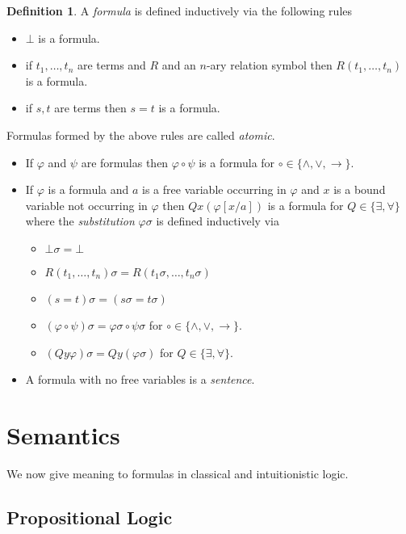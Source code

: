 \documentclass[a4paper,12pt]{report}
\theoremstyle{definition}
\theoremstyle{definition}
\theoremstyle{definition}
\theoremstyle{definition}
\theoremstyle{definition}
\newtheorem{definition}[theorem]{Definition}
\theoremstyle{definition}
\theoremstyle{definition}
\begin{document}
	\begin{definition}
		A \textit{formula} is defined inductively via the following rules
		\begin{itemize}
			\item $\bot$ is a formula.
			\item if $t_1,\dots,t_n$ are terms and $R$ and an $n$-ary relation symbol then $R(t_1, \dots, t_n)$ is a formula.
			\item if $s, t$ are terms then $s = t$ is a formula.
		\end{itemize}	
		Formulas formed by the above rules are called \textit{atomic}.
		\begin{itemize}
			\item If $\varphi$ and $\psi$ are formulas then $\varphi\circ\psi$ is a formula for $\circ\in\{\wedge,\vee,\to\}$.
			\item If $\varphi$ is a formula and $a$ is a free variable occurring in $\varphi$ and $x$ is a bound variable not occurring in $\varphi$ then $Qx(\varphi[x/a])$ is a formula for $Q\in\{\exists,\forall\}$ where the \textit{substitution} $\varphi\sigma$ is defined inductively via
			\begin{itemize}
				\item $\bot\sigma = \bot$
				\item $R(t_1,\dots,t_n)\sigma = R(t_1\sigma,\dots, t_n\sigma)$
				\item $(s = t)\sigma = (s\sigma = t\sigma)$
				\item $(\varphi\circ\psi)\sigma = \varphi\sigma\circ\psi\sigma$ for $\circ\in\{\wedge,\vee,\to\}$.
				\item $(Qy\varphi)\sigma = Qy(\varphi\sigma)$ for $Q\in\{\exists,\forall\}$.
			\end{itemize}
			\item A formula with no free variables is a \textit{sentence}.
		\end{itemize}
	\end{definition}

	\section{Semantics}
	
	We now give meaning to formulas in classical and intuitionistic logic.
	
	\subsection{Propositional Logic}
\end{document}
